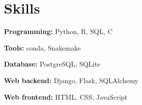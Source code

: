 \section{Skills}
\begin{multicols}{2}
\begin{denseouterlist}
\item \textbf{Programming:} Python, R, SQL, C
\item \textbf{Tools:} conda, Snakemake
\item \textbf{Database:} PostgreSQL, SQLite
\item \textbf{Web backend:} Django, Flask, SQLAlchemy
\item \textbf{Web frontend:} HTML, CSS, JavaScript
\end{denseouterlist}
\end{multicols}
